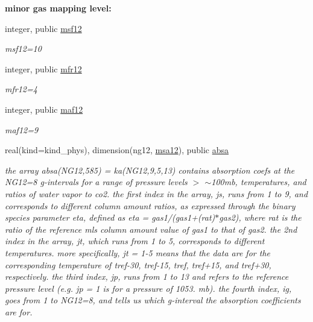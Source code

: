 \begin{Indent}\textbf{ minor gas mapping level\+:}\par
\begin{DoxyCompactItemize}
\item 
integer, public \hyperlink{group__module__radlw__kgbnn_ga3282a15ee0faaafd65509536a59e5b4f}{msf12}
\begin{DoxyCompactList}\small\item\em msf12=10 \end{DoxyCompactList}\item 
integer, public \hyperlink{group__module__radlw__kgbnn_gacd751a2e48d0286e3d25a9b658a8367a}{mfr12}
\begin{DoxyCompactList}\small\item\em mfr12=4 \end{DoxyCompactList}\item 
integer, public \hyperlink{group__module__radlw__kgbnn_ga9d7c05182e21605108bd65f47bb5569c}{maf12}
\begin{DoxyCompactList}\small\item\em maf12=9 \end{DoxyCompactList}\item 
real(kind=kind\+\_\+phys), dimension(ng12, \hyperlink{namespacemodule__radlw__kgb12_ad1ddd94fe11b11485502d1fe6f5a1615}{msa12}), public \hyperlink{group__module__radlw__kgbnn_ga7600bfa19dde3b47d8479f5766ee0c93}{absa}
\begin{DoxyCompactList}\small\item\em the array absa(\+N\+G12,585) = ka(\+N\+G12,9,5,13) contains absorption coefs at the N\+G12=8 g-\/intervals for a range of pressure levels $>$ $\sim$100mb, temperatures, and ratios of water vapor to co2. the first index in the array, js, runs from 1 to 9, and corresponds to different column amount ratios, as expressed through the binary species parameter eta, defined as eta = gas1/(gas1+(rat)$\ast$gas2), where rat is the ratio of the reference mls column amount value of gas1 to that of gas2. the 2nd index in the array, jt, which runs from 1 to 5, corresponds to different temperatures. more specifically, jt = 1-\/5 means that the data are for the corresponding temperature of tref-\/30, tref-\/15, tref, tref+15, and tref+30, respectively. the third index, jp, runs from 1 to 13 and refers to the reference pressure level (e.\+g. jp = 1 is for a pressure of 1053. mb). the fourth index, ig, goes from 1 to N\+G12=8, and tells us which g-\/interval the absorption coefficients are for. \end{DoxyCompactList}\item 

\end{DoxyCompactItemize}
\end{Indent}
